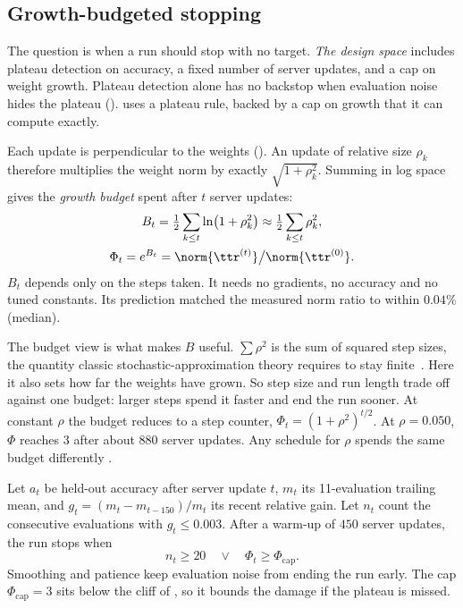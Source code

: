 \subsection{Growth-budgeted stopping}
\label{sec:ft:budget}
\label{sec:ft:stop}

The question is when a run should stop with no target.
\emph{The design space} includes plateau detection on accuracy, a fixed
number of server updates, and a cap on weight growth. Plateau detection
alone has no backstop when evaluation noise hides the plateau
(). \sys uses a plateau rule, backed by a cap
on growth that it can compute exactly.

Each update is perpendicular to the weights ().
An update of relative size $\rho_k$ therefore multiplies the weight
norm by exactly $\sqrt{1+\rho_k^2}$. Summing in log space gives the
\emph{growth budget} spent after $t$ server updates:
\begin{equation}
\begin{gathered}
B_t=\tfrac12\sum_{k\le t}\ln\!\left(1+\rho_k^2\right)\approx\tfrac12\sum_{k\le t}\rho_k^2,\\
\Phi_t=e^{B_t}=\norm{\ttr^{(t)}}\big/\norm{\ttr^{(0)}} .
\end{gathered}
\label{eq:ft:phi}
\end{equation}
$B_t$ depends only on the steps taken. It needs no gradients, no
accuracy and no tuned constants. Its prediction matched the measured
norm ratio to within $0.04\%$ (median).

The budget view is what makes $B$ useful. $\sum\rho^2$ is the sum of
squared step sizes, the quantity classic stochastic-approximation
theory requires to stay finite~\cite{robbins1951stochastic}. Here it
also sets how far the weights have grown. So step size and run length
trade off against one budget: larger steps spend it faster and end the
run sooner. At constant $\rho$ the budget reduces to a step counter,
$\Phi_t=(1+\rho^2)^{t/2}$. At $\rho=0.050$, $\Phi$ reaches $3$ after
about $880$ server updates. Any schedule for $\rho$ spends the same
budget differently .

Let $a_t$ be held-out accuracy after server update $t$, $m_t$ its
11-evaluation trailing mean, and $g_t=(m_t-m_{t-150})/m_t$ its recent
relative gain. Let $n_t$ count the consecutive evaluations with
$g_t\le0.003$. After a warm-up of $450$ server updates, the run stops
when
\begin{equation}
n_t\ge20\quad\lor\quad\Phi_t\ge\Phi_{\mathrm{cap}} .
\label{eq:ft:stop}
\end{equation}
Smoothing and patience keep evaluation noise from ending the run
early. The cap $\Phi_{\mathrm{cap}}=3$ sits below the cliff of
, so it bounds the damage if the plateau is
missed.

